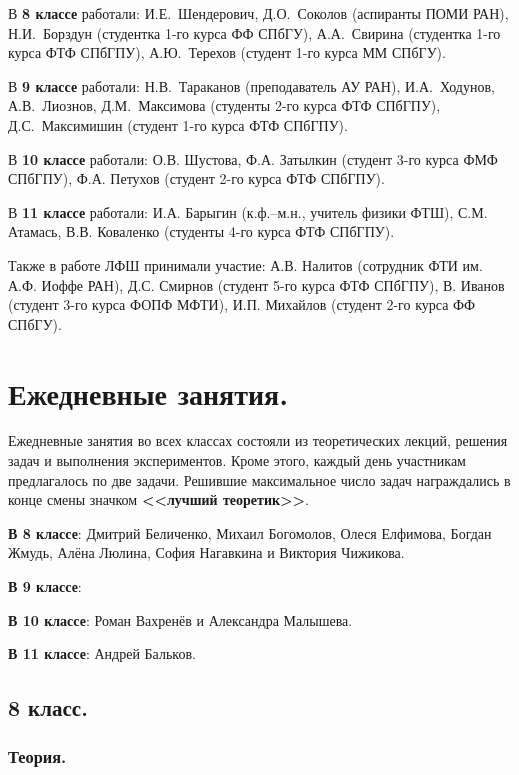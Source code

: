 \documentclass[12pt]{article}
\newlength{\h}
\newlength{\x}
\begin{document}
В \textbf{8 классе} работали: И.Е.~Шендерович, Д.О.~Соколов (аспиранты
ПОМИ РАН), Н.И.~Борздун (студентка 1-го курса ФФ СПбГУ), А.А.~Свирина
(студентка 1-го курса ФТФ СПбГПУ), А.Ю.~Терехов (студент 1-го курса ММ СПбГУ).

В \textbf{9 классе} работали: Н.В.~Тараканов (преподаватель АУ РАН),
И.А.~Ходунов, А.В.~Лиознов, Д.М.~Максимова (студенты 2-го курса ФТФ
СПбГПУ), Д.С.~Максимишин (студент 1-го курса ФТФ СПбГПУ). 

В \textbf{10 классе} работали: О.В. Шустова, Ф.А. Затылкин (студент 3-го
курса ФМФ СПбГПУ), Ф.А. Петухов (студент 2-го курса ФТФ СПбГПУ). 

В \textbf{11 классе} работали: И.А. Барыгин (к.ф.--м.н., учитель
физики ФТШ), С.М. Атамась, В.В. Коваленко (студенты 4-го курса ФТФ
СПбГПУ).

Также в работе ЛФШ принимали участие: А.В. Налитов (сотрудник ФТИ
им. А.Ф. Иоффе РАН), Д.С. Смирнов (студент 5-го курса ФТФ СПбГПУ),
В. Иванов (студент 3-го курса ФОПФ МФТИ), И.П. Михайлов (студент 2-го
курса ФФ СПбГУ).

\clearpage

\section{Ежедневные занятия.}
\label{sec:daily}

Ежедневные занятия во всех классах состояли из теоретических лекций,
решения задач и выполнения экспериментов. Кроме этого, каждый день
участникам предлагалось по две задачи. Решившие максимальное число
задач награждались в конце смены значком \textbf{<<лучший
  теоретик>>}.

\textbf{В 8 классе}: Дмитрий Беличенко, Михаил Богомолов, Олеся Елфимова,
Богдан Жмудь, Алёна Люлина, София Нагавкина и Виктория Чижикова. 

\textbf{В 9 классе}: 

\textbf{В 10 классе}: Роман Вахренёв и Александра Малышева. 

\textbf{В 11 классе}: Андрей Бальков.


\subsection{8 класс. }
\label{sec:daily8}

\subsubsection{Теория.}
\label{sec:daily8th}
\end{document}
